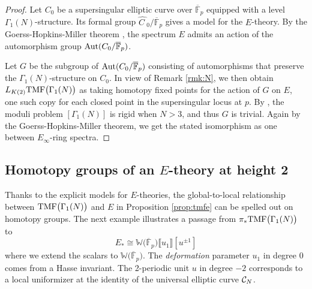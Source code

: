 \documentclass{gtpart}
\theoremstyle{definition}
\theoremstyle{remark}
\newcommand{\mb}[1]{\mathbb{#1}}
\newcommand{\Aut}{{\rm Aut}}
\newcommand{\cF}{\overline {\mb F}}
\newcommand{\CC}{{\cal C}}
\newcommand{\BW}{{\mb W}}
\newcommand{\HC}{\widehat{C~}\!}
\newcommand{\TMF}{{\rm TMF}}
\newcommand{\G}{\Gamma}
\newcommand{\lb}{\llbracket}
\newcommand{\rb}{\rrbracket}
\renewcommand{\=}{\approx}
\renewcommand{\-}{\sim}
\numberwithin{equation}{section}
\begin{document}
\begin{proof}
 Let $C_0$ be a supersingular elliptic curve over $\cF_p$ equipped with a level 
 $\G_1(N)$-structure.  Its formal group $\HC_0 / \cF_p$ gives a model for the 
 $E$-theory.  By the Goerss-Hopkins-Miller theorem \cite[Corollary 7.6]{GH}, the 
 spectrum $E$ admits an action of the automorphism group $\Aut(C_0 / \cF_p)$.  

 Let $G$ be the subgroup of $\Aut(C_0 / \cF_p)$ consisting of automorphisms that 
 preserve the $\G_1(N)$-structure on $C_0$.  In view of Remark \ref{rmk:N}, we 
 then obtain $L_{K(2)} \TMF\big(\G_1(N)\big)$ as taking homotopy fixed points 
 for the action of $G$ on $E$, one such copy for each closed point in the 
 supersingular locus at $p$.  By \cite[Corollary 2.7.4]{KM}, the moduli problem 
 $[\G_1(N)]$ is rigid when $N > 3$, and thus $G$ is trivial.  Again by the 
 Goerss-Hopkins-Miller theorem, we get the stated isomorphism as one between 
 $E_\infty$-ring spectra.  
\end{proof}



\subsection{Homotopy groups of an $E$-theory at height 2}
\label{subsec:mfe0}

Thanks to the explicit models for $E$-theories, the global-to-local relationship 
between $\TMF\big(\G_1(N)\big)$ and $E$ in Proposition \ref{prop:tmfe} can be 
spelled out on homotopy groups.  The next example illustrates a passage from 
$\pi_* \TMF\big(\G_1(N)\big)$ to 
\[
 E_* \cong \BW \big( \cF_p \big) \lb u_1 \rb [u^{\pm 1}] 
\]
where we extend the scalars to $\BW \big( \cF_p \big)$.  The {\em deformation} 
parameter $u_1$ in degree 0 comes from a Hasse invariant.  The 2-periodic unit 
$u$ in degree $-2$ corresponds to a local uniformizer at the identity of the 
universal elliptic curve $\CC_N$.  
\end{document}
